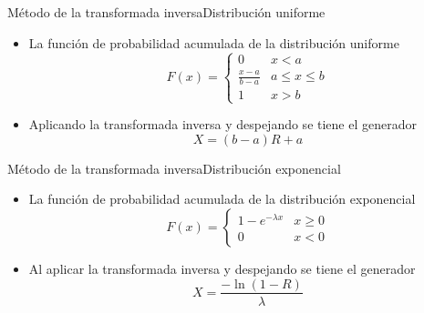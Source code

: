\begin{frame}{Método de la transformada inversa}{Distribución uniforme}
    \begin{itemize}
        \item La función de probabilidad acumulada de la distribución uniforme
        \begin{equation*}
            F(x)=\left\{\begin{array}{cc}
                 0 & x < a \\
                 \frac{x-a}{b-a} & a \leq x \leq b \\
                 1 & x > b
            \end{array}\right.
        \end{equation*}
        \item Aplicando la transformada inversa y despejando se tiene el generador \begin{equation*}
            X=(b-a)R+a
        \end{equation*}
    \end{itemize}
\end{frame}

\begin{frame}{Método de la transformada inversa}{Distribución exponencial}
    \begin{itemize}
        \item La función de probabilidad acumulada de la distribución exponencial
        \begin{equation*}
            F(x)=\left\{\begin{array}{cc}
                 1-e^{-\lambda x} & x \geq 0  \\
                 0 & x < 0
            \end{array}\right.
        \end{equation*}
        \item Al aplicar la transformada inversa y despejando se tiene el generador \begin{equation*}
            X=\frac{-\ln{(1-R)}}{\lambda}
        \end{equation*}
    \end{itemize}
\end{frame}

